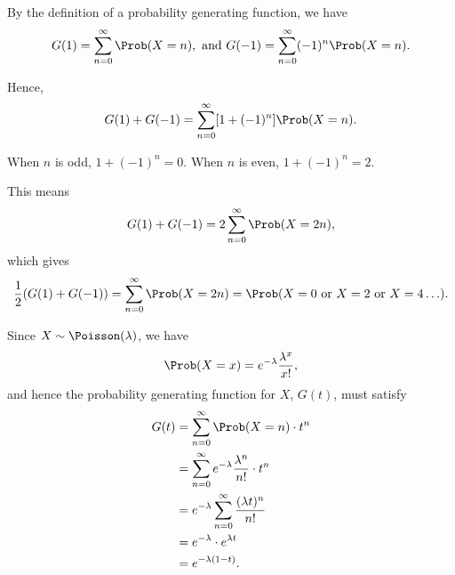 \Question{\currfilebase}

By the definition of a probability generating function, we have
\[
    G(1) = \sum_{n = 0}^{\infty} \Prob(X = n), \text{ and } G(-1) = \sum_{n = 0}^{\infty} (-1)^n \Prob(X = n).
\]

Hence,
\[
    G(1) + G(-1) = \sum_{n = 0}^{\infty} [1 + (-1)^n] \Prob(X = n).
\]

When \(n\) is odd, \(1 + (-1)^n = 0\). When \(n\) is even, \(1 + (-1)^n = 2\).

This means
\[
    G(1) + G(-1) = 2 \sum_{n = 0}^{\infty} \Prob(X = 2n),
\]
which gives
\[
    \frac{1}{2} (G(1) + G(-1)) = \sum_{n = 0}^{\infty} \Prob(X = 2n) = \Prob(X = 0 \text{ or } X = 2 \text{ or } X = 4 \ldots).
\]

Since \(X \sim \Poisson(\lambda)\), we have
\[
    \Prob(X = x) = e^{-\lambda} \frac{\lambda^x}{x!},
\]
and hence the probability generating function for \(X\), \(G(t)\), must satisfy
\begin{align*}
    G(t) & = \sum_{n = 0}^{\infty} \Prob(X = n) \cdot t^n                      \\
         & = \sum_{n = 0}^{\infty} e^{-\lambda} \frac{\lambda^n}{n!} \cdot t^n \\
         & = e^{-\lambda} \sum_{n = 0}^{\infty} \frac{(\lambda t)^n}{n!}       \\
         & = e^{-\lambda} \cdot e^{\lambda t}                                  \\
         & = e^{-\lambda (1 - t)}.
\end{align*}

